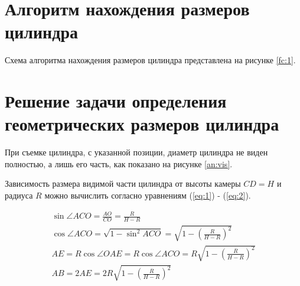 \section{Алгоритм нахождения размеров цилиндра}
Схема алгоритма нахождения размеров цилиндра представлена на рисунке \ref{fc:1}.
\begin{figure}[ht!]
\end{figure}




\section{Решение задачи определения геометрических размеров цилиндра}
При съемке цилиндра, с указанной позиции, диаметр цилиндра не виден полностью, а лишь его часть, как показано на рисунке \ref{an:vis}.

Зависимость размера видимой части цилиндра от высоты камеры \(CD = H\) и радиуса \(R\) можно вычислить согласно уравнениям (\eqref{eq:1}) - (\eqref{eq:2}).

\begin{gather}
\sin {\angle {ACO} } = \frac{AO}{CO} = \frac{R}{H-R} \label{eq:1} \\
\cos {\angle {ACO}} = \sqrt{1 - \sin ^2 {ACO}} = \sqrt {1 - (\frac {R}{H-R} )^ 2}\\ 
AE = R\cos {\angle {OAE}} = R\cos {\angle {ACO}} = R\sqrt {1 - (\frac {R}{H-R} )^ 2} \\
AB = 2AE = 2R\sqrt {1 - (\frac {R}{H-R} )^ 2} \label{eq:2}
\end{gather}

